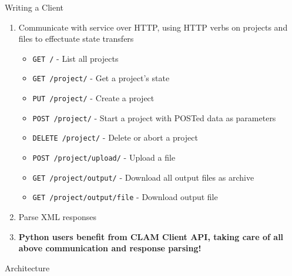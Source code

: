 \documentclass[compress]{beamer}
\begin{document}
\begin{frame}
    \begin{block}{Writing a Client}
        \begin{enumerate}
            \item Communicate with service over HTTP, using HTTP verbs on projects and files to effectuate state transfers 
            \begin{itemize}
                \item \texttt{GET /} - List all projects
                \item \texttt{GET /project/} - Get a project's state
                \item \texttt{PUT /project/} - Create a project
                \item \texttt{POST /project/} - Start a project with POSTed data as parameters
                \item \texttt{DELETE /project/} - Delete or abort a project
                \item \texttt{POST /project/upload/} - Upload a file
                \item \texttt{GET /project/output/} - Download all output files as archive
                \item \texttt{GET /project/output/file} - Download output file
            \end{itemize}
            \item Parse XML responses
            \item \textbf{Python users benefit from CLAM Client API, taking care of all above communication and response parsing!}
        \end{enumerate}
    \end{block}

\end{frame}

\begin{frame}
    \begin{block}{Architecture}
    \end{block}
\end{frame}
\end{document}
